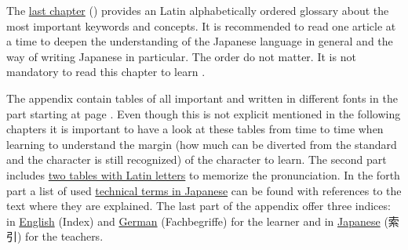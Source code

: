 The \hyperref[chap:Terminology]{last chapter} ()
provides an Latin alphabetically ordered glossary about the most important
keywords and concepts. It is recommended to read one article at a time to
deepen the understanding of the Japanese language in general and the way of
writing Japanese in particular. The order do not matter. It is not mandatory to
read this chapter to learn \jtopic.

The appendix contain tables of all important \textbf{\jtopic} and \jtopic{}
written in different fonts in the  part starting at
page \pageref{chap:KanaTables}. Even though this is not explicit mentioned in
the following chapters it is important to have a look at these tables from time
to time when learning \jtopic{} to understand the margin (how much can be
diverted from the standard and the character is still recognized) of the
character to learn. The second part includes \hyperref[chap:RomajiTables]{two
tables with Latin letters} to memorize the pronunciation. In the forth part a
list of used \hyperref[chap:ListOfJapaneseTechnicalTerms]{technical terms in
Japanese} can be found with references to the text where they are explained.
The last part of the appendix offer three indices: in
\hyperref[chap:EnglishIndex]{English} (Index) and
\hyperref[chap:GermanIndex]{German} (Fachbegriffe) for the learner and in
\hyperref[chap:JapaneseIndex]{Japanese} (索引) for the teachers.

